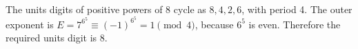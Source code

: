 The units digits of positive powers of 8 cycle as $8,4,2,6$, with period 4. The outer exponent is $E=7^{6^5}\equiv(-1)^{6^5}=1\pmod4$, because $6^5$ is even. Therefore the required units digit is $\boxed8$.
